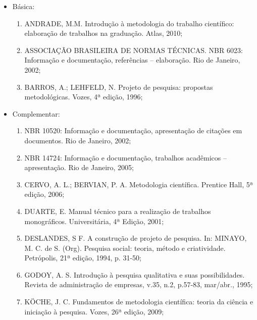 \begin{itemize} 

\item Básica:
    \begin{enumerate}

    \item ANDRADE, M.M. Introdução à metodologia do trabalho científico: elaboração de trabalhos na graduação. Atlas, 2010;
    
    \item ASSOCIAÇÃO BRASILEIRA DE NORMAS TÉCNICAS. NBR 6023: Informação e documentação, referências – elaboração. Rio de Janeiro, 2002;
    
    \item BARROS, A.; LEHFELD, N. Projeto de pesquisa: propostas metodológicas. Vozes, 4ª edição, 1996;
	
    \end{enumerate}

\item Complementar:
	\begin{enumerate} 

    \item NBR 10520: Informação e documentação, apresentação de citações em documentos. Rio de Janeiro, 2002;

    \item NBR 14724: Informação e documentação, trabalhos acadêmicos – apresentação. Rio de Janeiro, 2005;

    \item CERVO, A. L.; BERVIAN, P. A. Metodologia científica.  Prentice Hall, 5ª edição, 2006;

    \item DUARTE, E. Manual técnico para a realização de trabalhos monográficos.  Universitária, 4ª Edição, 2001;

    \item DESLANDES, S F. A construção de projeto de pesquisa. In: MINAYO, M. C. de S. (Org). Pesquisa social: teoria, método e criatividade.  Petrópolis, 21ª edição, 1994, p. 31-50;
 
    \item GODOY, A. S. Introdução à pesquisa qualitativa e suas possibilidades. Revista de administração de empresas, v.35, n.2, p.57-83, mar/abr., 1995;

    \item KÖCHE, J. C. Fundamentos de metodologia científica: teoria da ciência e iniciação à pesquisa. Vozes, 26ª edição, 2009;



\end{enumerate}
\end{itemize}
